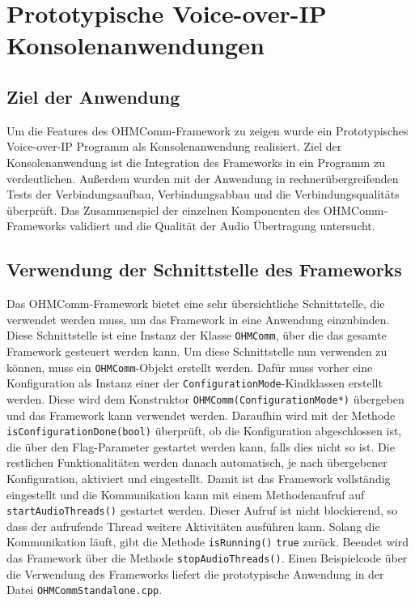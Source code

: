 \chapter{Prototypische Voice-over-IP Konsolenanwendungen}
\label{prototypProgram}
\section{Ziel der Anwendung}

Um die Features des OHMComm-Framework zu zeigen wurde ein Prototypisches Voice-over-IP Programm als Konsolenanwendung realisiert. Ziel der Konsolenanwendung ist die Integration des Frameworks in ein Programm zu verdeutlichen. Außerdem wurden mit der Anwendung in rechnerübergreifenden Tests der Verbindungsaufbau, Verbindungsabbau und die Verbindungsqualitäts überprüft. Das Zusammenspiel der einzelnen Komponenten des OHMComm-Frameworks validiert und die Qualität der Audio Übertragung untersucht. 

\section{Verwendung der Schnittstelle des Frameworks}
Das OHMComm-Framework bietet eine sehr übersichtliche Schnittstelle, die verwendet werden muss, um das Framework in eine Anwendung einzubinden. Diese Schnittstelle ist eine Instanz der Klasse \texttt{OHMComm}, über die das gesamte Framework gesteuert werden kann. Um diese Schnittstelle nun verwenden zu können, muss ein \texttt{OHMComm}-Objekt erstellt werden. Dafür muss vorher eine Konfiguration als Instanz einer der \texttt{ConfigurationMode}-Kindklassen erstellt werden. Diese wird dem Konstruktor \texttt{OHMComm(ConfigurationMode*)} übergeben und das Framework kann verwendet werden. Daraufhin wird mit der Methode \texttt{isConfigurationDone\allowbreak{}(bool)} überprüft, ob die Konfiguration abgeschlossen ist, die über den Flag-Parameter gestartet werden kann, falls dies nicht so ist. Die restlichen Funktionalitäten werden danach automatisch, je nach übergebener Konfiguration, aktiviert und eingestellt. Damit ist das Framework vollständig eingestellt und die Kommunikation kann mit einem Methodenaufruf auf \texttt{startAudioThreads()} gestartet werden. Dieser Aufruf ist nicht blockierend, so dass der aufrufende Thread weitere Aktivitäten ausführen kann. Solang die Kommunikation läuft, gibt die Methode \texttt{isRunning()} \texttt{true} zurück. Beendet wird das Framework über die Methode \texttt{stopAudioThreads()}. Einen Beispielcode über die Verwendung des Frameworks liefert die prototypische Anwendung in der Datei \texttt{OHMCommStandalone.cpp}.
